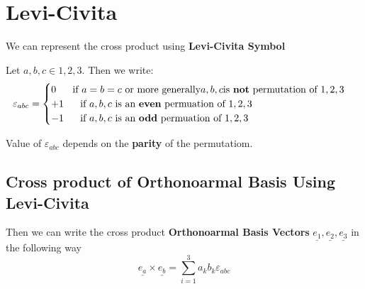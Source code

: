 \section{Levi-Civita}
We can represent the cross product using {\bf Levi-Civita Symbol}

\begin{definition}
	Let $a, b, c \in {1,2,3}$. Then we write:
	\begin{equation}
		\label{eq:levi-civita}
		\varepsilon_{abc}
		=
		\begin{cases}
			0  \ \ \ \ \  \text{if } \space a = b = c  \space \space \text{ or more generally} \space a,b,c \space \text{is {\bf not} permutation of } \space 1,2,3 \\
			+1  \ \ \ \ \  \text{if } \space a,b,c \space \text{ is an {\bf even} permuation of } \space 1,2,3                                                      \\
			-1  \ \ \ \ \ \text{if } \space a,b,c \space \text{ is an {\bf odd} permuation of } \space 1,2,3
		\end{cases}
	\end{equation}
\end{definition}

\begin{note}
	Value of $\varepsilon_{abc}$ depends on the {\bf parity} of the permutatiom.
\end{note}

\subsection{Cross product of Orthonoarmal Basis Using Levi-Civita}
\begin{definition}
	Then we can write the cross product {\bf Orthonoarmal Basis Vectors} $\underline{e_1}, \underline{e_2}, \underline{e_3}$ in the following way
	$$\underline{e_a} \times \underline{e_b} = \sum_{i=1}^{3}a_{k}b_{k}\varepsilon_{abc}$$

\end{definition}
